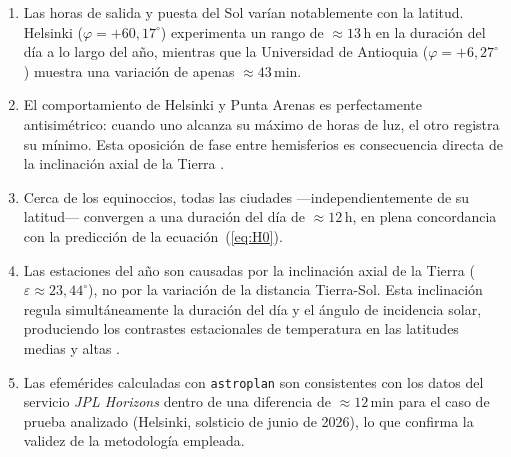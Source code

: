 \begin{enumerate}

  \item Las horas de salida y puesta del Sol varían notablemente con la latitud.
        Helsinki ($\varphi = +60{,}17^\circ$) experimenta un rango de
        $\approx 13$\,h en la duración del día a lo largo del año, mientras que la
        Universidad de Antioquia ($\varphi = +6{,}27^\circ$) muestra una variación de
        apenas $\approx 43$\,min.

  \item El comportamiento de Helsinki y Punta Arenas es perfectamente antisimétrico:
        cuando uno alcanza su máximo de horas de luz, el otro registra su mínimo.
        Esta oposición de fase entre hemisferios es consecuencia directa de la
        inclinación axial de la Tierra \citep{CarrollOstlie2017}.

  \item Cerca de los equinoccios, todas las ciudades —independientemente de su
        latitud— convergen a una duración del día de $\approx 12$\,h, en plena
        concordancia con la predicción de la ecuación~(\ref{eq:H0}).

  \item Las estaciones del año son causadas por la inclinación axial de la Tierra
        ($\varepsilon \approx 23{,}44^\circ$), no por la variación de la distancia
        Tierra-Sol.
        Esta inclinación regula simultáneamente la duración del día y el ángulo de
        incidencia solar, produciendo los contrastes estacionales de temperatura en las
        latitudes medias y altas \citep{CarrollOstlie2017, Meeus1998}.

  \item Las efemérides calculadas con \texttt{astroplan} \citep{Morris2018} son
        consistentes con los datos del servicio \textit{JPL Horizons}
        \citep{Giorgini1996} dentro de una diferencia de ${\approx}12$\,min para el
        caso de prueba analizado (Helsinki, solsticio de junio de 2026), lo que
        confirma la validez de la metodología empleada.

\end{enumerate}
